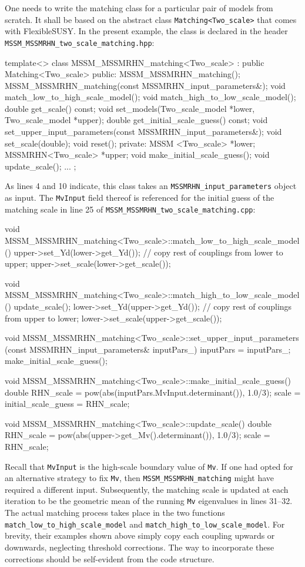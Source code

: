 \documentclass[final,3p,11pt,pdflatex]{elsarticle}
\makeatletter
\newcommand{\fs}{FlexibleSUSY\@\xspace}
\newcommand{\code}[1]{\lstinline|#1|}  %
\makeatother
\begin{document}
One needs to write the matching class for a particular pair of
models from scratch.
It shall be based on the abstract class \code{Matching<Two_scale>}
that comes with \fs.
In the present example, the class is declared in the header
\code{MSSM_MSSMRHN_two_scale_matching.hpp}:
\begin{numlstlisting}
template<> class MSSM_MSSMRHN_matching<Two_scale> : public Matching<Two_scale> {
public:
  MSSM_MSSMRHN_matching();
  MSSM_MSSMRHN_matching(const MSSMRHN_input_parameters&);
  void match_low_to_high_scale_model();
  void match_high_to_low_scale_model();
  double get_scale() const;
  void set_models(Two_scale_model *lower, Two_scale_model *upper);
  double get_initial_scale_guess() const;
  void set_upper_input_parameters(const MSSMRHN_input_parameters&);
  void set_scale(double);
  void reset();
private:
  MSSM   <Two_scale> *lower;
  MSSMRHN<Two_scale> *upper;
  void make_initial_scale_guess();
  void update_scale();
  ...
};
\end{numlstlisting}
As lines 4 and 10 indicate,
this class takes an \code{MSSMRHN_input_parameters} object as input.
The \code{MvInput} field thereof is referenced
for the initial guess of the matching scale
in line 25 of \code{MSSM_MSSMRHN_two_scale_matching.cpp}:
\begin{numlstlisting}
void MSSM_MSSMRHN_matching<Two_scale>::match_low_to_high_scale_model()
{
  upper->set_Yd(lower->get_Yd());
  // copy rest of couplings from lower to upper;
  upper->set_scale(lower->get_scale());
}

void MSSM_MSSMRHN_matching<Two_scale>::match_high_to_low_scale_model()
{
  update_scale();
  lower->set_Yd(upper->get_Yd());
  // copy rest of couplings from upper to lower;
  lower->set_scale(upper->get_scale());
}

void MSSM_MSSMRHN_matching<Two_scale>::set_upper_input_parameters
(const MSSMRHN_input_parameters& inputPars_)
{
  inputPars = inputPars_;
  make_initial_scale_guess();
}

void MSSM_MSSMRHN_matching<Two_scale>::make_initial_scale_guess()
{
  double RHN_scale = pow(abs(inputPars.MvInput.determinant()), 1.0/3);
  scale = initial_scale_guess = RHN_scale;
}

void MSSM_MSSMRHN_matching<Two_scale>::update_scale()
{
  double RHN_scale = pow(abs(upper->get_Mv().determinant()), 1.0/3);
  scale = RHN_scale;
}
\end{numlstlisting}
Recall that \code{MvInput} is the high-scale boundary value of \code{Mv}.
If one had opted for an alternative strategy to fix \code{Mv},
then \code{MSSM_MSSMRHN_matching} might have required a different input.
Subsequently, the matching scale is updated at each iteration
to be the geometric mean of the running \code{Mv} eigenvalues
in lines 31--32.
The actual matching process takes place in the two functions
\code{match_low_to_high_scale_model} and \code{match_high_to_low_scale_model}.
For brevity,
their examples shown above simply copy each coupling
upwards or downwards, neglecting threshold corrections.
The way to incorporate these corrections should be self-evident
from the code structure.
\end{document}
